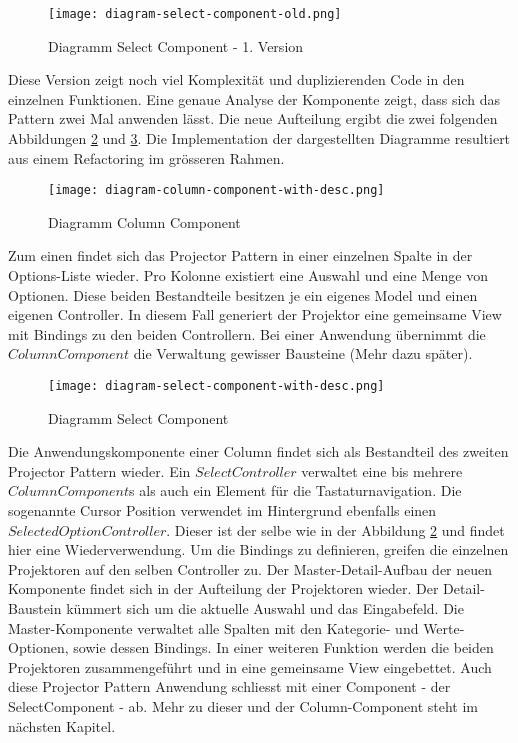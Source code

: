 \begin{figure}[!htb]
    \centering
    \texttt{[image: diagram-select-component-old.png]}
    \caption{Diagramm Select Component - 1. Version}
    \label{img:DiagramSelectComponentOld}
\end{figure}

Diese Version zeigt noch viel Komplexität und duplizierenden Code in den einzelnen Funktionen.
Eine genaue Analyse der Komponente zeigt, dass sich das Pattern zwei Mal anwenden lässt.
Die neue Aufteilung ergibt die zwei folgenden Abbildungen \ref{img:DiagramColumnComponent} und \ref{img:DiagramSelectComponent}.
Die Implementation der dargestellten Diagramme resultiert aus einem Refactoring im grösseren Rahmen.

\begin{figure}[!htb]
    \centering
    \texttt{[image: diagram-column-component-with-desc.png]}
    \caption{Diagramm Column Component}
    \label{img:DiagramColumnComponent}
\end{figure}

Zum einen findet sich das Projector Pattern in einer einzelnen Spalte in der Options-Liste wieder.
Pro Kolonne existiert eine Auswahl und eine Menge von Optionen.
Diese beiden Bestandteile besitzen je ein eigenes Model und einen eigenen Controller.
In diesem Fall generiert der Projektor eine gemeinsame View mit Bindings zu den beiden Controllern.
Bei einer Anwendung übernimmt die $ColumnComponent$ die Verwaltung gewisser Bausteine (Mehr dazu später).

\begin{figure}[!htb]
    \centering
    \texttt{[image: diagram-select-component-with-desc.png]}
    \caption{Diagramm Select Component}
    \label{img:DiagramSelectComponent}
\end{figure}

Die Anwendungskomponente einer Column findet sich als Bestandteil des zweiten Projector Pattern wieder.
Ein $SelectController$ verwaltet eine bis mehrere $ColumnComponent$s als auch ein Element für die Tastaturnavigation.
Die sogenannte Cursor Position verwendet im Hintergrund ebenfalls einen $SelectedOptionController$. 
Dieser ist der selbe wie in der Abbildung \ref{img:DiagramColumnComponent} und findet hier eine Wiederverwendung.
Um die Bindings zu definieren, greifen die einzelnen Projektoren auf den selben Controller zu.
Der Master-Detail-Aufbau der neuen Komponente findet sich in der Aufteilung der Projektoren wieder.
Der Detail-Baustein kümmert sich um die aktuelle Auswahl und das Eingabefeld.
Die Master-Komponente verwaltet alle Spalten mit den Kategorie- und Werte-Optionen, sowie dessen Bindings.
In einer weiteren Funktion werden die beiden Projektoren zusammengeführt und in eine gemeinsame View eingebettet.
Auch diese Projector Pattern Anwendung schliesst mit einer Component - der SelectComponent - ab.
Mehr zu dieser und der Column-Component steht im nächsten Kapitel.


